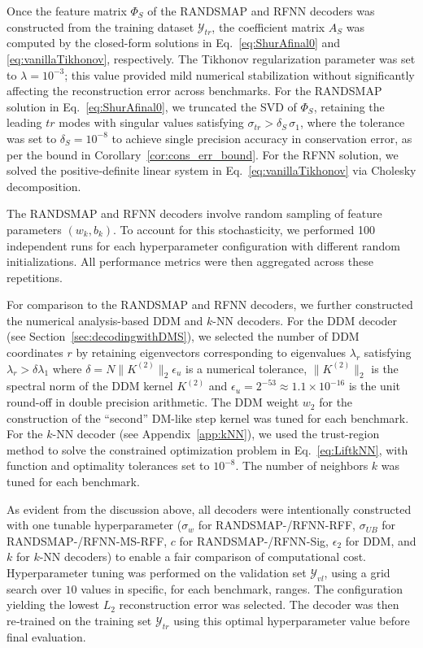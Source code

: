 \documentclass{article}
\begin{document}
Once the feature matrix $\Phi_S$ of the RANDSMAP and RFNN decoders was constructed from the training dataset $\mathcal{Y}_{tr}$, the coefficient matrix $A_S$ was computed by the closed-form solutions in Eq.~\eqref{eq:ShurAfinal0} and \eqref{eq:vanillaTikhonov}, respectively. The Tikhonov regularization parameter was set to $\lambda=10^{-3}$; this value provided mild numerical stabilization without significantly affecting the reconstruction error across benchmarks. For the RANDSMAP solution in Eq.~\eqref{eq:ShurAfinal0}, we truncated the SVD of $\Phi_S$, retaining the leading $tr$ modes with singular values satisfying $\sigma_{tr}>\delta_S\, \sigma_1$, where the tolerance was set to $\delta_S=10^{-8}$ to achieve single precision accuracy in conservation error, as per the bound in Corollary~\ref{cor:cons_err_bound}. For the RFNN solution, we solved the positive‑definite linear system in Eq.~\eqref{eq:vanillaTikhonov} via Cholesky decomposition.

The RANDSMAP and RFNN decoders involve random sampling of feature parameters $(w_k,b_k)$. To account for this stochasticity, we performed 100 independent runs for each hyperparameter configuration with different random initializations. All performance metrics were then aggregated across these repetitions.

For comparison to the RANDSMAP and RFNN decoders, we further constructed the numerical analysis-based DDM and $k$-NN decoders. For the DDM decoder (see Section~\ref{sec:decodingwithDMS}), we selected the number of DDM coordinates $r$ by retaining eigenvectors corresponding to eigenvalues $\lambda_r$ satisfying $\lambda_r>\delta \lambda_1$ where $\delta=N\|K^{(2)}\|_2\epsilon_u$ is a numerical tolerance, $\|K^{(2)}\|_2$ is the spectral norm of the DDM kernel $K^{(2)}$ and $\epsilon_u=2^{-53}\approx1.1\times 10^{-16}$ is the unit round-off in double precision arithmetic. The DDM weight $w_2$ for the construction of the ``second'' DM-like step kernel was tuned for each benchmark. For the $k$-NN decoder (see Appendix~\ref{app:kNN}), we used the trust-region method \cite{coleman1996interior} to solve the constrained optimization problem in Eq.~\eqref{eq:LiftkNN}, with function and optimality tolerances set to $10^{-8}$. The number of neighbors $k$ was tuned for each benchmark. 

As evident from the discussion above, all decoders were intentionally constructed with one tunable hyperparameter ($\sigma_w$ for RANDSMAP-/RFNN-RFF, $\sigma_{UB}$ for RANDSMAP-/RFNN-MS-RFF, $c$ for RANDSMAP-/RFNN-Sig, $\epsilon_2$ for DDM, and $k$ for $k$-NN decoders) to enable a fair comparison of computational cost. Hyperparameter tuning was performed on the validation set $\mathcal{Y}_{vl}$, using a grid search over $10$ values in specific, for each benchmark, ranges. The configuration yielding the lowest $L_2$ reconstruction error was selected. The decoder was then re‑trained on the training set $\mathcal{Y}_{tr}$ using this optimal hyperparameter value before final evaluation.
 
\end{document}
